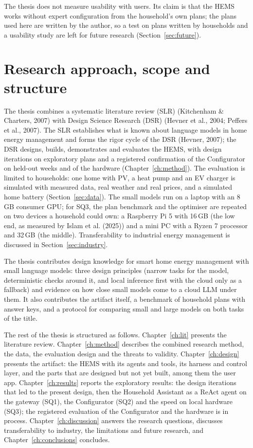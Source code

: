 \documentclass[12pt,a4paper]{report}
\begin{document}
The thesis does not measure usability with users. Its claim is that the
HEMS works without expert configuration from the household's own plans;
the plans used here are written by the author, so a test on plans
written by households and a usability study are left for future
research (Section~\ref{sec:future}).

\section{Research approach, scope and structure}
\label{sec:approach}

The thesis combines a systematic literature review (SLR)
(Kitchenham \& Charters, 2007) with Design Science Research (DSR)
(Hevner et al., 2004; Peffers et al., 2007). The SLR establishes what is known
about language models in home energy management and forms the rigor
cycle of the DSR (Hevner, 2007); the DSR designs, builds,
demonstrates and evaluates the HEMS, with design
iterations on exploratory plans and a registered confirmation of the
Configurator on held-out weeks and of the hardware
(Chapter~\ref{ch:method}). The evaluation is limited to
households: one home with PV, a heat pump and an EV charger is
simulated with measured data, real weather and real prices, and a
simulated home battery (Section~\ref{sec:data}). The small models run on a laptop with an
8\,GB consumer GPU; for SQ3, the plan benchmark and the optimiser are
repeated on two devices a household could own: a Raspberry Pi 5 with
16\,GB (the low end, as measured by Islam et al. (2025)) and a mini PC
with a Ryzen 7 processor and 32\,GB (the middle). Transferability to industrial energy
management is discussed in Section~\ref{sec:industry}.

The thesis contributes design knowledge for smart home energy
management with small language models: three design principles (narrow
tasks for the model, deterministic checks around it, and local
inference first with the cloud only as a fallback) and evidence on how
close small models come to a cloud LLM under them. It also contributes
the artifact itself, a benchmark of household plans with answer keys,
and a protocol for comparing small and large models on both tasks of
the title.

The rest of the thesis is structured as follows. Chapter~\ref{ch:lit}
presents the literature review. Chapter~\ref{ch:method} describes the
combined research method, the data, the evaluation design and the
threats to validity. Chapter~\ref{ch:design} presents the artifact: the
HEMS with its agents and tools, its harness and control layer, and the
parts that are designed but not yet built, among them the user app.
Chapter~\ref{ch:results} reports the exploratory results: the design
iterations that led to the present design, then the Household
Assistant as a ReAct agent on the gateway (SQ1), the Configurator
(SQ2) and the speed on local hardware (SQ3);
the registered evaluation of the Configurator and the hardware is in
process. Chapter~\ref{ch:discussion}
answers the research questions, discusses transferability to industry,
the limitations and future research, and Chapter~\ref{ch:conclusions}
concludes.
\end{document}

